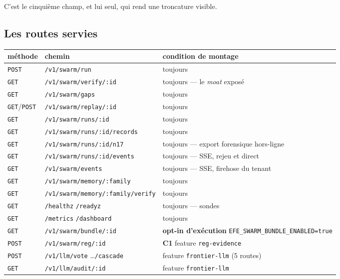 \documentclass[10pt]{report}
\newcommand{\code}[1]{\texttt{\small #1}}
\newcommand{\att}[1]{\textcolor{amber}{\textbf{#1}}}
\newcommand{\cun}{\textcolor{c1col}{\textbf{C1}}}
\begin{document}
C'est le cinquième champ, et lui seul, qui rend une troncature visible.

\subsection{Les routes servies}

\begin{longtable}{@{}p{2.0cm} p{6.6cm} p{6.4cm}@{}}
\toprule \textbf{méthode} & \textbf{chemin} & \textbf{condition de montage} \\ \midrule \endhead
\code{POST} & \code{/v1/swarm/run} & toujours \\
\code{GET} & \code{/v1/swarm/verify/:id} & toujours --- le \emph{moat} exposé \\
\code{GET} & \code{/v1/swarm/gaps} & toujours \\
\code{GET}/\code{POST} & \code{/v1/swarm/replay/:id} & toujours \\
\code{GET} & \code{/v1/swarm/runs/:id} & toujours \\
\code{GET} & \code{/v1/swarm/runs/:id/records} & toujours \\
\code{GET} & \code{/v1/swarm/runs/:id/n17} & toujours --- export forensique hors-ligne \\
\code{GET} & \code{/v1/swarm/runs/:id/events} & toujours --- SSE, rejeu et direct \\
\code{GET} & \code{/v1/swarm/events} & toujours --- SSE, firehose du tenant \\
\code{GET} & \code{/v1/swarm/memory/:family} & toujours \\
\code{GET} & \code{/v1/swarm/memory/:family/verify} & toujours \\
\code{GET} & \code{/healthz} \quad \code{/readyz} & toujours --- sondes \\
\code{GET} & \code{/metrics} \quad \code{/dashboard} & toujours \\
\code{GET} & \code{/v1/swarm/bundle/:id} & \att{opt-in d'exécution} \code{EFE\_SWARM\_BUNDLE\_ENABLED=true} \\
\code{POST} & \code{/v1/swarm/reg/:id} & \cun{} feature \code{reg-evidence} \\
\code{POST} & \code{/v1/llm/vote} \dots \code{/cascade} & feature \code{frontier-llm} (5 routes) \\
\code{GET} & \code{/v1/llm/audit/:id} & feature \code{frontier-llm} \\
\bottomrule
\end{longtable}
\end{document}
